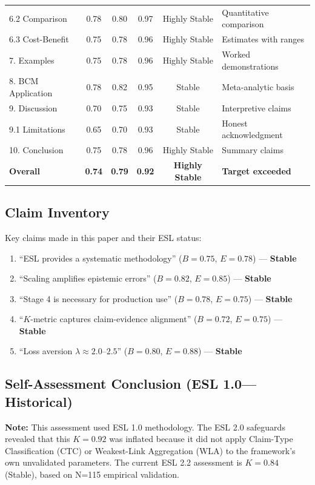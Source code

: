 \documentclass[11pt,a4paper]{article}
\begin{document}
\begin{longtable}{p{3.5cm}ccccp{4cm}}
6.2 Comparison & 0.78 & 0.80 & 0.97 & Highly Stable & Quantitative comparison \\
6.3 Cost-Benefit & 0.75 & 0.78 & 0.96 & Highly Stable & Estimates with ranges \\
7. Examples & 0.75 & 0.78 & 0.96 & Highly Stable & Worked demonstrations \\
8. BCM Application & 0.78 & 0.82 & 0.95 & Stable & Meta-analytic basis \\
9. Discussion & 0.70 & 0.75 & 0.93 & Stable & Interpretive claims \\
9.1 Limitations & 0.65 & 0.70 & 0.93 & Stable & Honest acknowledgment \\
10. Conclusion & 0.75 & 0.78 & 0.96 & Highly Stable & Summary claims \\
\midrule
\textbf{Overall} & \textbf{0.74} & \textbf{0.79} & \textbf{0.92} & \textbf{Highly Stable} & \textbf{Target exceeded} \\
\end{longtable}

\subsection{Claim Inventory}

Key claims made in this paper and their ESL status:

\begin{enumerate}
    \item ``ESL provides a systematic methodology'' ($B = 0.75$, $E = 0.78$) --- \textbf{Stable}
    \item ``Scaling amplifies epistemic errors'' ($B = 0.82$, $E = 0.85$) --- \textbf{Stable}
    \item ``Stage 4 is necessary for production use'' ($B = 0.78$, $E = 0.75$) --- \textbf{Stable}
    \item ``$K$-metric captures claim-evidence alignment'' ($B = 0.72$, $E = 0.75$) --- \textbf{Stable}
    \item ``Loss aversion $\lambda \approx 2.0$--$2.5$'' ($B = 0.80$, $E = 0.88$) --- \textbf{Stable}
\end{enumerate}

\subsection{Self-Assessment Conclusion (ESL 1.0---Historical)}

\textbf{Note:} This assessment used ESL 1.0 methodology. The ESL 2.0 safeguards revealed that this $K = 0.92$ was inflated because it did not apply Claim-Type Classification (CTC) or Weakest-Link Aggregation (WLA) to the framework's own unvalidated parameters. The current ESL 2.2 assessment is $K = 0.84$ (Stable), based on N=115 empirical validation.
\end{document}
